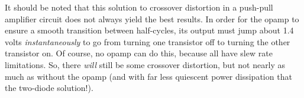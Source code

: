 It should be noted that this solution to crossover distortion in a push-pull amplifier circuit does not always yield the best results.  In order for the opamp to ensure a smooth transition between half-cycles, its output must jump about 1.4 volts {\it instantaneously} to go from turning one transistor off to turning the other transistor on.  Of course, no opamp can do this, because all have slew rate limitations.  So, there {\it will} still be some crossover distortion, but not nearly as much as without the opamp (and with far less quiescent power dissipation that the two-diode solution!).




